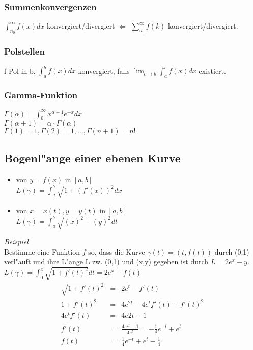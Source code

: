 \documentclass[10pt, a4paper, twocolumn]{scrartcl}
\begin{document}
\subsubsection{Summenkonvergenzen}

$\int^\infty_{n_0}f(x)dx$ konvergiert/divergiert $\Leftrightarrow$ $\sum^\infty_{n_0}f(k)$ konvergiert/divergiert.

\subsubsection{Polstellen}
f Pol in b. $\int^b_a f(x)dx$ konvergiert, falls $\lim_{c\rightarrow b}\int^c_a f(x)dx$ existiert.


\subsubsection{Gamma-Funktion}
$\Gamma(\alpha)=\int^\infty_0 x^{\alpha-1}e^{-x}dx$\\
$\Gamma (\alpha+1)=\alpha\cdotp\Gamma(\alpha)$\\
$\Gamma(1)=1,\Gamma(2)=1,\ldots,\Gamma(n+1)=n!$

\subsection{Bogenl"ange einer ebenen Kurve}

\begin{itemize}
 \item von $y=f(x)$ in $[a,b]$\\
  $L(\gamma)=\int^b_a \sqrt{1+(f'(x))^2}dx$
 \item von $x=x(t),y=y(t)$ in $[a,b]$\\
  $L(\gamma)=\int^b_a\sqrt{(\dot{x})^2+(\dot{y})^2}dt$
\end{itemize}

\textit{Beispiel}\\
Bestimme eine Funktion $f$ so, dass die Kurve $\gamma(t)=(t,f(t))$ durch (0,1) verl"auft und ihre L"ange L zw. (0,1) und (x,y) gegeben ist durch $L=2e^x-y$.\\
$L(\gamma)=\int^x_0 \sqrt{1+ f'(t)^2}dt=2e^x-f(t)$
\begin{eqnarray}
 \sqrt{1+f'(t)^2}&	=&	2e^t-f'(t)\nonumber\\
 1+f'(t)^2&		=&	4e^{2t}-4e^{t}f'(t)+f'(t)^2 \nonumber\\
 4e^t f'(t) &		=&	4e2t-1\nonumber\\
 f'(t)&			=&	\frac{4e^{2t}-1}{4e^t}=-\frac{1}{4}e^{-t}+e^t\nonumber\\
 f(t) &			=&	\frac{1}{4}e^{-t}+e^t-\frac{1}{4}\nonumber\\
\end{eqnarray}
\end{document}
